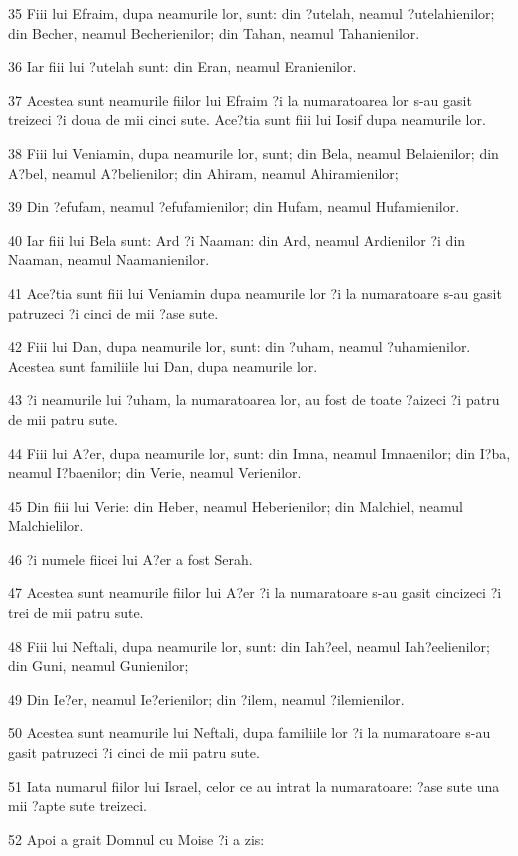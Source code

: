 \par 35 Fiii lui Efraim, dupa neamurile lor, sunt: din ?utelah, neamul ?utelahienilor; din Becher, neamul Becherienilor; din Tahan, neamul Tahanienilor.
\par 36 Iar fiii lui ?utelah sunt: din Eran, neamul Eranienilor.
\par 37 Acestea sunt neamurile fiilor lui Efraim ?i la numaratoarea lor s-au gasit treizeci ?i doua de mii cinci sute. Ace?tia sunt fiii lui Iosif dupa neamurile lor.
\par 38 Fiii lui Veniamin, dupa neamurile lor, sunt; din Bela, neamul Belaienilor; din A?bel, neamul A?belienilor; din Ahiram, neamul Ahiramienilor;
\par 39 Din ?efufam, neamul ?efufamienilor; din Hufam, neamul Hufamienilor.
\par 40 Iar fiii lui Bela sunt: Ard ?i Naaman: din Ard, neamul Ardienilor ?i din Naaman, neamul Naamanienilor.
\par 41 Ace?tia sunt fiii lui Veniamin dupa neamurile lor ?i la numaratoare s-au gasit patruzeci ?i cinci de mii ?ase sute.
\par 42 Fiii lui Dan, dupa neamurile lor, sunt: din ?uham, neamul ?uhamienilor. Acestea sunt familiile lui Dan, dupa neamurile lor.
\par 43 ?i neamurile lui ?uham, la numaratoarea lor, au fost de toate ?aizeci ?i patru de mii patru sute.
\par 44 Fiii lui A?er, dupa neamurile lor, sunt: din Imna, neamul Imnaenilor; din I?ba, neamul I?baenilor; din Verie, neamul Verienilor.
\par 45 Din fiii lui Verie: din Heber, neamul Heberienilor; din Malchiel, neamul Malchielilor.
\par 46 ?i numele fiicei lui A?er a fost Serah.
\par 47 Acestea sunt neamurile fiilor lui A?er ?i la numaratoare s-au gasit cincizeci ?i trei de mii patru sute.
\par 48 Fiii lui Neftali, dupa neamurile lor, sunt: din Iah?eel, neamul Iah?eelienilor; din Guni, neamul Gunienilor;
\par 49 Din Ie?er, neamul Ie?erienilor; din ?ilem, neamul ?ilemienilor.
\par 50 Acestea sunt neamurile lui Neftali, dupa familiile lor ?i la numaratoare s-au gasit patruzeci ?i cinci de mii patru sute.
\par 51 Iata numarul fiilor lui Israel, celor ce au intrat la numaratoare: ?ase sute una mii ?apte sute treizeci.
\par 52 Apoi a grait Domnul cu Moise ?i a zis:
